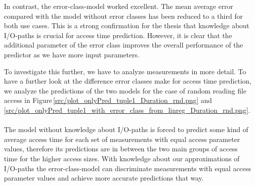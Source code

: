 \documentclass{superfri}
\begin{document}
In contrast, the error-class-model worked excellent. The mean average error compared with the model without error classes has been reduced to a third for both use cases.
This is a strong confirmation for the thesis that knowledge about I/O-paths is crucial for access time prediction.
However, it is clear that the additional parameter of the error class improves the overall performance of the predictor as we have more input parameters. 

\medskip

To investigate this further, we have to analyze measurements in more detail.
To have a further look at the difference error classes make for access time prediction, we analyze the predictions of the two models for the case of random reading file access in Figure\,\ref{src/plot_onlyPred_tuple1_Duration_rnd.png} and \ref{src/plot_onlyPred_tuple1_with_error_class_from_linreg_Duration_rnd.png}.
\\
\\
The model without knowledge about I/O-paths is forced to predict some kind of average access time for each set of measurements with equal access parameter values, therefore its predictions are in between the two main groups of access time for the higher access sizes.
With knowledge about our approximations of I/O-paths the error-class-model can discriminate measurements with equal access parameter values and achieve more accurate predictions that way.
\end{document}
